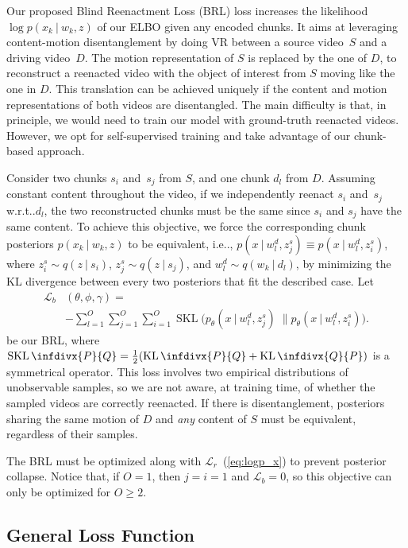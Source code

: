 \documentclass[journal]{IEEEtran}
\makeatletter
\newcommand{\kl}{\operatorname{KL}\infdivx}
\newcommand{\skl}{\operatorname{SKL}\infdivx}
\newcommand\givenbase[1][]{\:#1\lvert\:}
\let\given\givenbase
\DeclareRobustCommand\onedot{\futurelet\@let@token\@onedot}
\def\@onedot{\ifx\@let@token.\else.\null\fi\xspace}
\def\ie{{i.e}\onedot} \def\Ie{{I.e}\onedot}
\def\wrt{w.r.t\onedot} \def\dof{d.o.f\onedot}
\makeatother
\begin{document}
Our proposed Blind Reenactment Loss (BRL) loss increases the likelihood $\log p(x_{k} \given w_k, z)$ of our ELBO given any encoded chunks.
It aims at leveraging content-motion disentanglement by doing VR between a source video~$S$ and a driving video~$D$.
The motion representation of $S$ is replaced by the one of $D$, to reconstruct a reenacted video with the object of interest from $S$ moving like the one in $D$.
This translation can be achieved uniquely if the content and motion representations of both videos are disentangled.
The main difficulty is that, in principle, we would need to train our model with ground-truth reenacted videos.
However, we opt for self-supervised training and take advantage of our chunk-based approach.

Consider two chunks $s_i$ and~$s_j$ from $S$, and one chunk $d_l$ from $D$.
Assuming constant content throughout the video, if we independently reenact $s_i$ and~$s_j$ \wrt $d_l$, the two reconstructed chunks must be the same since $s_i$ and $s_j$ have the same content.
To achieve this objective, we force the corresponding chunk posteriors $p(x_{k} \given w_k, z)$ to be equivalent, \ie, $p(x \given w_l^d, z_j^s) \equiv p(x \given w_l^d, z_i^s)$, where $z_i^s \sim q(z \given s_i)$, $z_j^s \sim q(z \given s_j)$, and $w_l^d \sim q(w_k \given d_l)$, by minimizing the KL divergence between every two posteriors that fit the described case.
Let
\begin{align}
  \label{eq:brl}
\mathcal{L}_b & (\theta,\phi,\gamma) = \nonumber \\
& -\sum_{l=1}^O\sum_{j=1}^O\sum_{i=1}^O \operatorname{SKL} \Big(p_\theta(x \given  w_l^d,z_j^s) \;\big\| p_\theta(x \given w_l^d,z_i^s) \Big).
\end{align}
be our BRL, where $\skl{P}{Q}= \frac{1}{2}(\kl{P}{Q} + \kl{Q}{P})$ is a symmetrical operator.
This loss involves two empirical distributions of unobservable samples, so we are not aware, at training time, of whether the sampled videos are correctly reenacted.
If there is disentanglement, posteriors sharing the same motion of $D$ and \textit{any} content of $S$ must be equivalent, regardless of their samples.

The BRL must be optimized along with $\mathcal{L}_r$~(\ref{eq:logp_x}) to prevent posterior collapse.
Notice that, if $O = 1$, then $j=i=1$ and $\mathcal{L}_b=0$, so this objective can only be optimized for $O \geq 2$.

\subsection{General Loss Function}
\end{document}
